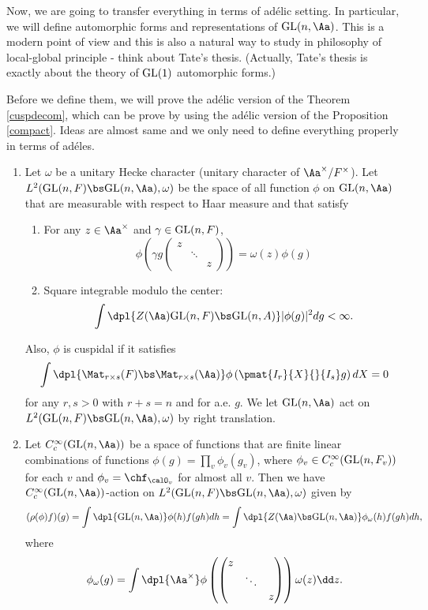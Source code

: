 Now, we are going to transfer everything in terms of ad\'elic setting. In particular, we will define automorphic forms and representations of $\GL(n, \Aa)$. 
This is a modern point of view and this is also a natural way to study in philosophy of local-global principle - think about Tate's thesis. 
(Actually, Tate's thesis is exactly about the theory of $\mathrm{GL}(1)$ automorphic forms.) 

Before we define them, we will prove the ad\'elic version of the Theorem \ref{cuspdecom}, which can be prove by using the ad\'elic version of the Proposition \ref{compact}. 
Ideas are almost same and we only need to define everything properly in terms of ad\'eles. 

\begin{definition}
\label{l2def}
\begin{enumerate}
\item
Let $\omega$ be a unitary Hecke character (unitary character of  $\Aa^{\times}/F^{\times}$). 
Let $L^{2}(\GL(n, F) \bs \GL(n, \Aa), \omega)$ be the space of all function $\phi$ on $\GL(n, \Aa)$ that are measurable with respect to Haar measure and that satisfy
\begin{enumerate}
\item For any $z\in \Aa^{\times}$ and $\gamma \in \mathrm{GL}(n, F)$, 
$$
\phi\left(\gamma g\begin{pmatrix} z & & \\ & \ddots & \\ & & z\end{pmatrix}\right) = \omega(z)\phi(g)
$$
\item Square integrable modulo the center:
$$
\int\dpl{Z(\Aa)\GL(n, F) \bs \GL(n, A)} |\phi(g)|^{2} dg < \infty. 
$$ 
\end{enumerate}
Also, $\phi$ is cuspidal if it satisfies 
$$
\int\dpl{\Mat_{r\times s}(F) \bs \Mat_{r\times s}(\Aa)} \phi\left(\pmat{I_{r}}{X}{}{I_{s}}g\right)dX = 0
$$
for any $r, s>0$ with $r + s = n$ and for a.e. $g$. 
We let $\GL(n, \Aa)$ act on $L^{2}(\GL(n, F)\bs \GL(n, \Aa), \omega)$ by right translation. 
\item Let $C_{c}^{\infty}(\GL(n, \Aa))$ be a space of functions that are finite linear combinations of functions $\phi(g) = \prod_{v} \phi_{v}(g_{v})$, where $\phi_v \in C_{c}^{\infty}(\mathrm{GL}(n, F_{v}))$ for each $v$ and $\phi_v = \chf_{\calO_{v}}$ for almost all $v$. 
Then we have $C_{c}^{\infty}(\GL(n, \Aa))$-action on $L^{2}(\GL(n, F)\bs \GL(n, \Aa), \omega)$ given by 
$$
(\rho(\phi)f)(g) = \int\dpl{\GL(n, \Aa)} \phi(h)f(gh)dh = \int\dpl{Z(\Aa)\bs \GL(n, \Aa)} \phi_{\omega}(h) f(gh)dh, 
$$
where
$$
\phi_{\omega}(g) = \int\dpl{\Aa^{\times}} \phi \left(\begin{pmatrix}z & & \\ & \ddots & \\ & & z \end{pmatrix}\right)\omega(z)\dd z.
$$
\end{enumerate}
\end{definition}

